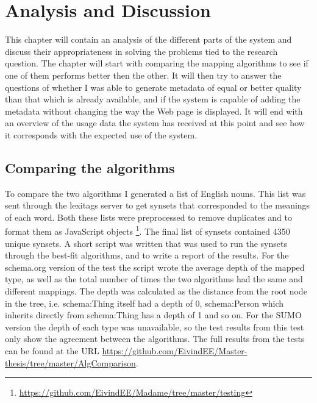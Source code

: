 
\chapter{Analysis and Discussion} %

\label{AnalysisAndDiscussion}


This chapter will contain an analysis of the different parts of the system and discuss their appropriateness in solving the
problems tied to the research question.
The chapter will start with comparing the mapping algorithms to see if one of them performs better then the other.
It will then try to answer the questions of whether I was able to generate metadata of equal or better quality than that
which is already available, and if the system is capable of adding the metadata without changing the way the Web page is displayed.
It will end with an overview of the usage data the system has received at this point and see how it corresponds with the expected use of the system.

\section{Comparing the algorithms}
\label{ComparingAlgorithms}
To compare the two algorithms I generated a list of English nouns.
This list was sent through the lexitags server to get synsets that corresponded to the meanings of each word.
Both these lists were preprocessed to remove duplicates and to format them as JavaScript objects
\footnote{\url{https://github.com/EivindEE/Madame/tree/master/testing}}.
The final list of synsets contained 4350 unique synsets.
A short script was written that was used to run the synsets through the best-fit algorithms,
and to write a report of the results.
For the schema.org version of the test the script wrote the average depth of the mapped type,
as well as the total number of times the two algorithms had the same and different mappings.
The depth was calculated as the distance from the root node in the tree,
i.e. schema:Thing itself had a depth of 0,
schema:Person which inherits directly from schema:Thing has a depth of 1 and so on.
For the SUMO version the depth of each type was unavailable,
so the test results from this test only show the agreement between the algorithms.
The full results from the tests can be found at the URL \url{https://github.com/EivindEE/Master-thesis/tree/master/AlgComparison}.


